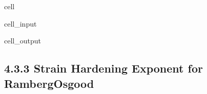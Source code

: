 \documentclass[letterpaper,10pt,english]{jupyterBook}
\begin{document}
\begin{sphinxuseclass}{cell}
\begin{sphinxVerbatimInput}
\begin{sphinxuseclass}{cell_input}
		\end{sphinxuseclass}\end{sphinxVerbatimInput}
		\begin{sphinxVerbatimOutput}
			
			\begin{sphinxuseclass}{cell_output}
				\noindent{}
				
		\end{sphinxuseclass}\end{sphinxVerbatimOutput}
		
	\end{sphinxuseclass}
	
	\subsection{4.3.3 Strain Hardening Exponent for Ramberg\sphinxhyphen{}Osgood}
	\label{\detokenize{4 Mechanical Properties:strain-hardening-exponent-for-ramberg-osgood}}
\end{document}
